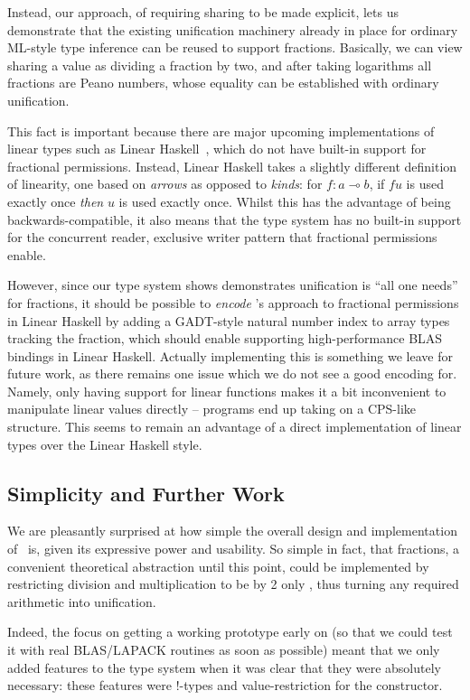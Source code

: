 Instead, our approach, of requiring sharing to be made explicit, lets
us demonstrate that the existing unification machinery already in
place for ordinary ML-style type inference can be reused to support
fractions. Basically, we can view sharing a value as dividing a
fraction by two, and after taking logarithms all fractions are Peano
numbers, whose equality can be established with ordinary unification.

This fact is important because there are major upcoming
implementations of linear types such as Linear
Haskell~\cite{bernardy2017linear}, which do not have built-in support
for fractional permissions. Instead, Linear Haskell takes a slightly
different definition of linearity, one based on \emph{arrows} as
opposed to \emph{kinds}: for $f : a \multimap b$, if $f u$ is used
exactly once \emph{then} $u$ is used exactly once. Whilst this has the
advantage of being backwards-compatible, it also means that the type
system has no built-in support for the concurrent reader, exclusive
writer pattern that fractional permissions enable.

However, since our type system shows demonstrates unification is ``all
one needs'' for fractions, it should be possible to \emph{encode}
\lang's approach to fractional permissions in Linear Haskell by adding
a GADT-style natural number index to array types tracking the
fraction, which should enable supporting high-performance BLAS
bindings in Linear Haskell. Actually implementing this is something we
leave for future work, as there remains one issue which we do not see
a good encoding for. Namely, only having support for linear functions
makes it a bit inconvenient to manipulate linear values directly --
programs end up taking on a CPS-like structure. This seems to remain
an advantage of a direct implementation of linear types over the
Linear Haskell style.


\subsection{Simplicity and Further Work}

We are pleasantly surprised at how simple the overall design and implementation
of \lang\ is, given its expressive power and usability.  So simple in fact,
that fractions, a convenient theoretical abstraction until this point, could be
implemented by restricting division and multiplication to be by 2 only
\cite{boyland2003}, thus turning any required arithmetic into unification.

Indeed, the focus on getting a working prototype early on (so that we could
test it with real BLAS/LAPACK routines as soon as possible) meant that we only
added features to the type system when it was clear that they were absolutely
necessary: these features were !-types and value-restriction for the
 constructor. 

